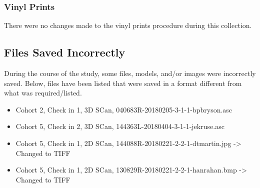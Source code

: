 \subsubsection{Vinyl Prints}
There were no changes made to the vinyl prints procedure during this collection.

\newpage

\subsection{Files Saved Incorrectly}

   During the course of the study, some files, models, and/or images were incorrectly saved. Below, files have been listed that were saved in a format different from what was required/listed. 
   
\begin{itemize}
\item Cohort 2, Check in 1, 3D SCan, 040683R-20180205-3-1-1-bpbryson.asc
\item Cohort 5, Check in 2, 3D SCan, 144363L-20180404-3-1-1-jekruse.asc
\item Cohort 5, Check in 1, 2D SCan, 144088R-20180221-2-2-1-dtmartin.jpg -> Changed to TIFF
\item Cohort 5, Check in 1, 2D SCan, 130829R-20180221-2-2-1-hanrahan.bmp -> Changed to TIFF
\end{itemize}
   

